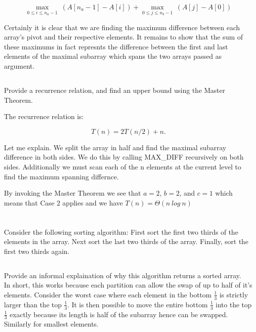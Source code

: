 \documentclass{amsart}
\theoremstyle{definition}
\theoremstyle{remark}
\numberwithin{equation}{section}
\begin{document}
$$ \max_{0 \leq i \leq n_a -1}\ (A[n_a-1] - A[i]) + \max_{0 \leq j \leq n_b -1}\ (A[j] - A[0]) $$

\proof 

Certainly it is clear that we are finding the maximum difference between each
array's pivot and their respective elements. It remains to show that the sum
of these maximums in fact represnts the difference between the first and last
elements of the maximal subarray which spans the two arrays passed as argument.



\subsection{} Provide a recurrence relation, and find an upper bound
using the Master Theorem.

The recurrence relation is:

$$ T( n ) = 2T(n/2) + n. $$

Let me explain. We split the array in half and find the maximal subarray
difference in both sides. We do this by calling MAX\_DIFF recursively on
both sides. Additionally we must scan each of the n elements at the current
level to find the maximum spanning differnce.

By invoking the Master Theorem we see that $a=2$, $b=2$, and $c=1$ which
means that Case 2 applies and we have $T( n ) = \Theta( n\ log\ n )$

\section{} Consider the following sorting algorithm: First sort the
first two thirds of the elements in the array. Next sort the last two
thirds of the array. Finally, sort the first two thirds again.

\subsection{} Provide an informal explaination of why this algorithm
returns a sorted array. \\

In short, this works because each partition can allow the swap of up to
half of it's elements. Consider the worst case where each element in the
bottom $\frac{1}{3}$ is strictly larger than the top $\frac{1}{3}$. It
is then possible to move the entire bottom $\frac{1}{3}$ into the top
$\frac{1}{3}$ exactly because its length is half of the subarray hence
can be swapped. Similarly for smallest elements.
\end{document}
